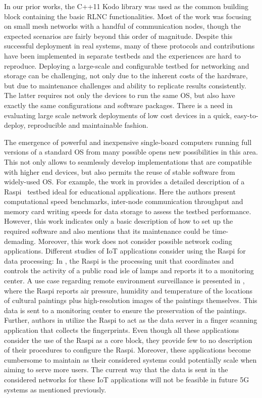 In our prior works, the C++11 Kodo library \cite{kodo2011pedersen} was used as the common building block containing the basic \ac{RLNC} functionalities. Most of the work was focusing on small mesh networks with a handful of communication nodes, though the expected scenarios are fairly beyond this order of magnitude. Despite this successful deployment in real systems, many of these protocols and contributions have been implemented in separate testbeds and the experiences are hard to reproduce. Deploying a large-scale and configurable testbed for networking and storage can be challenging, not only due to the inherent costs of the hardware, but due to maintenance challenges and ability to replicate results consistently. The latter requires not only the devices to run the same \ac{OS}, but also have exactly the same configurations and software packages. There is a need in evaluating large scale network deployments of low cost devices in a quick, easy-to-deploy, reproducible and maintainable fashion.

The emergence of powerful and inexpensive single-board computers running full versions of a standard \ac{OS} from many possible opens new possibilities in this area. This not only allows to seamlessly develop implementations that are compatible with higher end devices, but also permits the reuse of stable software from widely-used \ac{OS}. For example, the work in \cite{cox2014iridis} provides a detailed description of a \ac{Raspi}~\cite{making_of_pi} testbed ideal for educational applications. Here the authors present computational speed benchmarks, inter-node communication throughput and memory card writing speeds for data storage to assess the testbed performance. However, this work indicates only a basic description of how to set up the required software and also mentions that its maintenance could be time-demading. Moreover, this work does not consider possible network coding applications. Different studies of \ac{IoT} applications consider using the \ac{Raspi} for data processing: In \cite{leccese2014smartcity}, the \ac{Raspi} is the processing unit that coordinates and controls the activity of a public road isle of lamps and reports it to a monitoring center. A use case regarding remote environment surveillance is presented in \cite{leccese2014newimaging}, where the \ac{Raspi} reports air pressure, humidity and temperature of the locations of cultural paintings plus high-resolution images of the paintings themselves. This data is sent to a monitoring center to ensure the preservation of the paintings. Further, authors in \cite{sapes2016finger} utilize the \ac{Raspi} to act as the data server in a finger scanning application that collects the fingerprints. Even though all these applications consider the use of the \ac{Raspi} as a core block, they provide few to no description of their procedures to configure the \ac{Raspi}. Moreover, these applications become cumbersome to maintain as their considered systems could potentially scale when aiming to serve more users. The current way that the data is sent in the considered networks for these \ac{IoT} applications will not be feasible in future 5G systems as mentioned previously.

